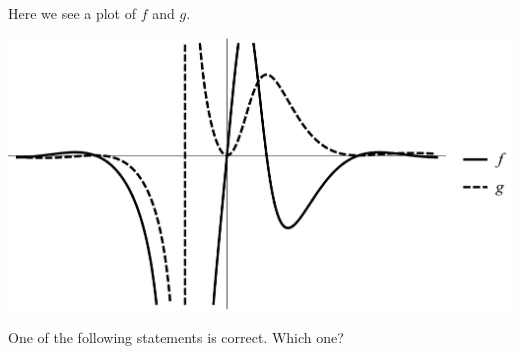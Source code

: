 \documentclass{ximera}
\author{Bart Snapp}
\begin{document}
\begin{exercise}

Here we see a plot of $f$ and $g$. 
\begin{image}
\includegraphics[width=.5\textwidth]{graphFandG10.png}
\end{image}
One of the following statements is correct. Which one?
\begin{multipleChoice}
\end{multipleChoice}
\end{exercise}
\end{document}
